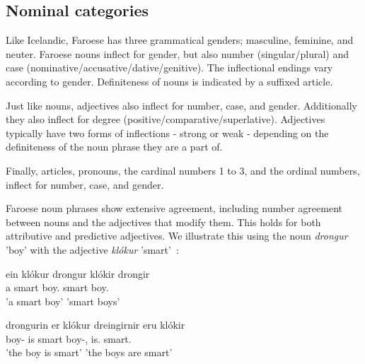 \documentclass[12pt,%
]{lin-v2/lin}
\let\Oldsubsection\subsection
\renewcommand{\subsection}{\FloatBarrier\Oldsubsection}
\begin{document}
\subsection{Nominal categories}

Like Icelandic, Faroese has three grammatical genders; masculine, feminine, and neuter.
Faroese nouns inflect for gender, but also number (singular/plural) and case (nominative/accusative/dative/genitive).
The inflectional endings vary according to gender. Definiteness of nouns is indicated by a suffixed article.

Just like nouns, adjectives also inflect for number, case, and gender. Additionally they also inflect for degree
(positive/comparative/superlative). Adjectives typically have two forms of inflections - strong or weak - depending
on the definiteness of the noun phrase they are a part of.

Finally, articles, pronouns, the cardinal numbers 1 to 3, and the ordinal numbers, inflect for number, case, and gender.

Faroese noun phrases show extensive agreement, including number agreement between nouns and the adjectives that modify them.
This holds for both attributive and predictive adjectives. We illustrate this using the noun \emph{drongur} 'boy'
with the adjective \emph{klókur} 'smart'~\citep[61]{faroese}:
\begin{exe}
    \ex
    \begin{xlist}
    \item \gll ein klókur drongur klókir drongir\\
    a smart boy.\Sg{} smart boy.\Pl{}\\
    \trans 'a smart boy' 'smart boys'
    \item \gll drongurin er klókur dreingirnir eru klókir\\
    boy-\Det{} is smart boy-\Det,\Pl{} is.\Pl{} smart.\Pl\\
    \trans 'the boy is smart' 'the boys are smart'
    \end{xlist}
\end{exe}
\end{document}
